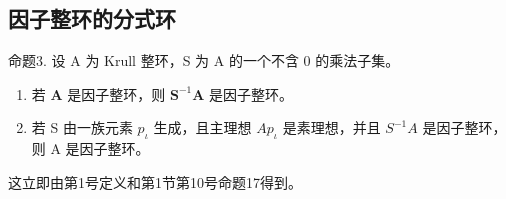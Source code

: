 \subsection{因子整环的分式环}

命题3. 设 A 为 Krull 整环，S 为 A 的一个不含 0 的乘法子集。

\begin{enumerate}
\def\labelenumi{(\roman{enumi})}
\item
  若 \(\mathbf{A}\) 是因子整环，则 \(\mathbf{S}^{-1}\mathbf{A}\) 是因子整环。
\item
  若 S 由一族元素 \(p_{\iota}\) 生成，且主理想 \(Ap_{\iota}\) 是素理想，并且 \(S^{-1}A\) 是因子整环，则 A 是因子整环。
\end{enumerate}

这立即由第1号定义和第1节第10号命题17得到。

